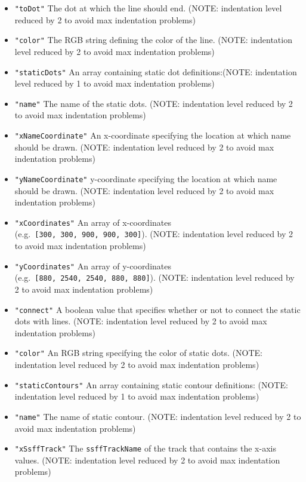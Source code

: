 \documentclass[]{book}
\begin{document}
\begin{itemize}
\begin{itemize}
\begin{itemize}
\begin{itemize}
      \item
        \texttt{"toDot"} The dot at which the line should end. (NOTE: indentation level reduced by 2 to avoid max indentation problems)
      \item
        \texttt{"color"} The RGB string defining the color of the line. (NOTE: indentation level reduced by 2 to avoid max indentation problems)
      \item
        \texttt{"staticDots"} An array containing static dot definitions:(NOTE: indentation level reduced by 1 to avoid max indentation problems)
      \item
        \texttt{"name"} The name of the static dots. (NOTE: indentation level reduced by 2 to avoid max indentation problems)
      \item
        \texttt{"xNameCoordinate"} An x-coordinate specifying the location at which name should be drawn. (NOTE: indentation level reduced by 2 to avoid max indentation problems)
      \item
        \texttt{"yNameCoordinate"} y-coordinate specifying the location at which name should be drawn. (NOTE: indentation level reduced by 2 to avoid max indentation problems)
      \item
        \texttt{"xCoordinates"} An array of x-coordinates (e.g.~\texttt{{[}300,~300,~900,~900,~300{]}}). (NOTE: indentation level reduced by 2 to avoid max indentation problems)
      \item
        \texttt{"yCoordinates"} An array of y-coordinates (e.g.~\texttt{{[}880,~2540,~2540,~880,~880{]}}). (NOTE: indentation level reduced by 2 to avoid max indentation problems)
      \item
        \texttt{"connect"} A boolean value that specifies whether or not to connect the static dots with lines. (NOTE: indentation level reduced by 2 to avoid max indentation problems)
      \item
        \texttt{"color"} An RGB string specifying the color of static dots. (NOTE: indentation level reduced by 2 to avoid max indentation problems)
      \item
        \texttt{"staticContours"} An array containing static contour definitions: (NOTE: indentation level reduced by 1 to avoid max indentation problems)
      \item
        \texttt{"name"} The name of static contour. (NOTE: indentation level reduced by 2 to avoid max indentation problems)
      \item
        \texttt{"xSsffTrack"} The \texttt{ssffTrackName} of the track that contains the x-axis values. (NOTE: indentation level reduced by 2 to avoid max indentation problems)

\end{itemize}
\end{itemize}
\end{itemize}
\end{itemize}
\end{document}
